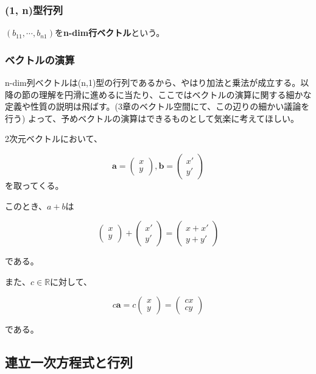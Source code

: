 \documentclass[dvipdfmx,autodetect-engine]{jsarticle}
\begin{document}
\subsubsection{(1, n)型行列}

$(b_{11}, \cdots, b_{n1})$を{\bf n-dim行ベクトル}という。

\subsubsection{ベクトルの演算}

n-dim列ベクトルは(n,1)型の行列であるから、やはり加法と乗法が成立する。以降の節の理解を円滑に進めるに当たり、ここではベクトルの演算に関する細かな定義や性質の説明は飛ばす。(3章のベクトル空間にて、この辺りの細かい議論を行う) よって、予めベクトルの演算はできるものとして気楽に考えてほしい。

2次元ベクトルにおいて、

$$
\bm{a} = \begin{pmatrix}
x \\
y
\end{pmatrix},
\bm{b} = \begin{pmatrix}
x' \\
y'
\end{pmatrix}
$$
を取ってくる。

このとき、$a + b$は

$$
\begin{pmatrix}
x \\
y
\end{pmatrix} + 
\begin{pmatrix}
x' \\
y'
\end{pmatrix}
= \begin{pmatrix}
x + x' \\
y + y'
\end{pmatrix}
$$

である。

また、$c \in \mathbb{R}$に対して、

$$
c\bm{a} =
c\begin{pmatrix}
x \\
y
\end{pmatrix}
= \begin{pmatrix}
cx \\
cy
\end{pmatrix}
$$

である。

\subsection{連立一次方程式と行列}
\end{document}
